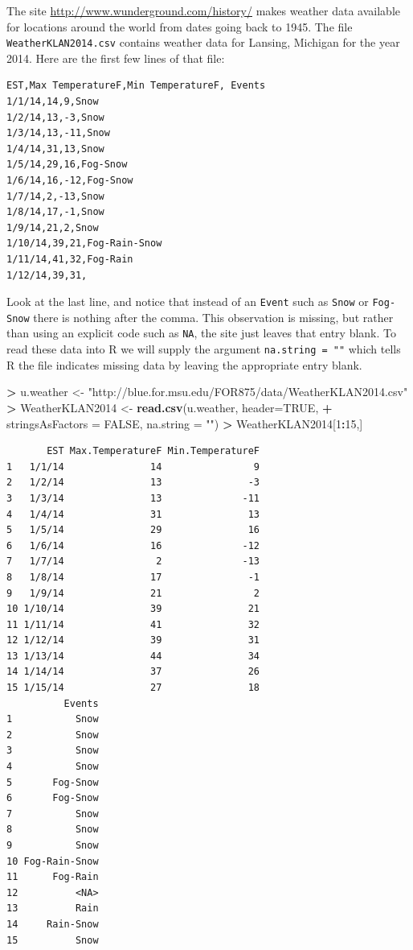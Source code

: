 \documentclass[]{krantz}
\makeatletter
\newenvironment{Shaded}{\begin{snugshade}}{\end{snugshade}}
\newcommand{\DataTypeTok}[1]{\textcolor[rgb]{0.27,0.27,0.27}{#1}}
\newcommand{\DecValTok}[1]{\textcolor[rgb]{0.06,0.06,0.06}{#1}}
\newcommand{\KeywordTok}[1]{\textcolor[rgb]{0.27,0.27,0.27}{\textbf{#1}}}
\newcommand{\NormalTok}[1]{#1}
\newcommand{\OperatorTok}[1]{\textcolor[rgb]{0.43,0.43,0.43}{\textbf{#1}}}
\newcommand{\OtherTok}[1]{\textcolor[rgb]{0.37,0.37,0.37}{#1}}
\newcommand{\StringTok}[1]{\textcolor[rgb]{0.5,0.5,0.5}{#1}}
\newenvironment{kframe}{%
\medskip{}
\setlength{\fboxsep}{.8em}
 \def\at@end@of@kframe{}%
 \ifinner\ifhmode%
  \def\at@end@of@kframe{\end{minipage}}%
  \begin{minipage}{\columnwidth}%
 \fi\fi%
 \def\FrameCommand##1{\hskip\@totalleftmargin \hskip-\fboxsep
 \colorbox{shadecolor}{##1}\hskip-\fboxsep
     \hskip-\linewidth \hskip-\@totalleftmargin \hskip\columnwidth}%
 \MakeFramed {\advance\hsize-\width
   \@totalleftmargin\z@ \linewidth\hsize
   \@setminipage}}%
 {\par\unskip\endMakeFramed%
 \at@end@of@kframe}
\renewenvironment{Shaded}{\begin{kframe}}{\end{kframe}}
\makeatother
\begin{document}
The site \url{http://www.wunderground.com/history/} makes weather data available for locations around the world from dates going back to 1945. The file \texttt{WeatherKLAN2014.csv} contains weather data for Lansing, Michigan for the year 2014. Here are the first few lines of that file:

\begin{verbatim}
EST,Max TemperatureF,Min TemperatureF, Events
1/1/14,14,9,Snow
1/2/14,13,-3,Snow
1/3/14,13,-11,Snow
1/4/14,31,13,Snow
1/5/14,29,16,Fog-Snow
1/6/14,16,-12,Fog-Snow
1/7/14,2,-13,Snow
1/8/14,17,-1,Snow
1/9/14,21,2,Snow
1/10/14,39,21,Fog-Rain-Snow
1/11/14,41,32,Fog-Rain
1/12/14,39,31,
\end{verbatim}

Look at the last line, and notice that instead of an \texttt{Event} such as \texttt{Snow} or \texttt{Fog-Snow} there is nothing after the comma. This observation is missing, but rather than using an explicit code such as \texttt{NA}, the site just leaves that entry blank. To read these data into R we will supply the argument \texttt{na.string\ =\ ""} which tells R the file indicates missing data by leaving the appropriate entry blank.

\begin{Shaded}
\begin{Highlighting}[]
\OperatorTok{>}\StringTok{ }\NormalTok{u.weather <-}\StringTok{ "http://blue.for.msu.edu/FOR875/data/WeatherKLAN2014.csv"}
\OperatorTok{>}\StringTok{ }\NormalTok{WeatherKLAN2014 <-}\StringTok{ }\KeywordTok{read.csv}\NormalTok{(u.weather, }\DataTypeTok{header=}\OtherTok{TRUE}\NormalTok{, }
\OperatorTok{+}\StringTok{                             }\DataTypeTok{stringsAsFactors =} \OtherTok{FALSE}\NormalTok{, }\DataTypeTok{na.string =} \StringTok{""}\NormalTok{)}
\OperatorTok{>}\StringTok{ }\NormalTok{WeatherKLAN2014[}\DecValTok{1}\OperatorTok{:}\DecValTok{15}\NormalTok{,]}
\end{Highlighting}
\end{Shaded}

\begin{verbatim}
       EST Max.TemperatureF Min.TemperatureF
1   1/1/14               14                9
2   1/2/14               13               -3
3   1/3/14               13              -11
4   1/4/14               31               13
5   1/5/14               29               16
6   1/6/14               16              -12
7   1/7/14                2              -13
8   1/8/14               17               -1
9   1/9/14               21                2
10 1/10/14               39               21
11 1/11/14               41               32
12 1/12/14               39               31
13 1/13/14               44               34
14 1/14/14               37               26
15 1/15/14               27               18
          Events
1           Snow
2           Snow
3           Snow
4           Snow
5       Fog-Snow
6       Fog-Snow
7           Snow
8           Snow
9           Snow
10 Fog-Rain-Snow
11      Fog-Rain
12          <NA>
13          Rain
14     Rain-Snow
15          Snow
\end{verbatim}
\end{document}
